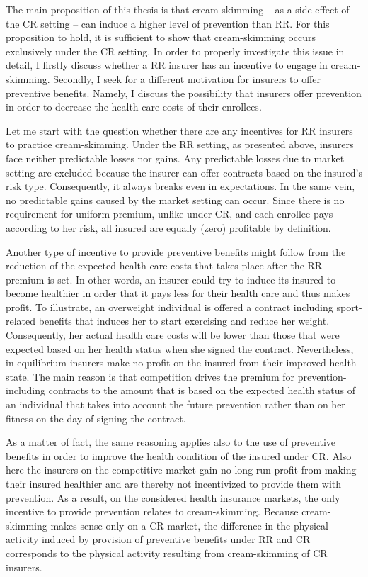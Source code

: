 \documentclass[12pt,english]{article}%
\makeatletter
\renewcommand{\subsection}{\@startsection{subsection}{2}{0mm}{-0.1\baselineskip}{0.5\baselineskip}{\normalfont\bf\flushleft}}
\makeatother
\begin{document}
\subsection{Preventive benefits in the risk-rated contracts}
The main proposition of this thesis is that cream-skimming -- as a side-effect of the CR setting -- can induce a higher level of prevention than RR. For this proposition to hold, it is sufficient to show that cream-skimming occurs exclusively under the CR setting. In order to properly investigate this issue in detail, I firstly discuss whether a RR insurer has an incentive to engage in cream-skimming. Secondly, I seek for a different motivation for insurers to offer preventive benefits. Namely, I discuss the possibility that insurers offer prevention in order to decrease the health-care costs of their enrollees.

Let me start with the question whether there are any incentives for RR insurers to practice cream-skimming. Under the RR setting, as presented above, insurers face neither predictable losses nor gains. Any predictable losses due to market setting are excluded because the insurer can offer contracts based on the insured's risk type. Consequently, it always breaks even in expectations. In the same vein, no predictable gains caused by the market setting can occur. Since there is no requirement for uniform premium, unlike under CR, and each enrollee pays according to her risk, all insured are equally (zero) profitable by definition. 

Another type of incentive to provide preventive benefits might follow from the reduction of the expected health care costs that takes place after the RR premium is set. In other words, an insurer could try to induce its insured to become healthier in order that it pays less for their health care and thus makes profit. To illustrate, an overweight individual is offered a contract including sport-related benefits that induces her to start exercising and reduce her weight. Consequently, her actual health care costs will be lower than those that were expected based on her health status when she signed the contract. Nevertheless, in equilibrium insurers make no profit on the insured from their improved health state. The main reason is that competition drives the premium for prevention-including contracts to the amount that is based on the expected health status of an individual that takes into account the future prevention rather than on her fitness on the day of signing the contract.

As a matter of fact, the same reasoning applies also to the use of preventive benefits in order to improve the health condition of the insured under CR. Also here the insurers on the competitive market gain no long-run profit from making their insured healthier and are thereby not incentivized to provide them with prevention. As a result, on the considered health insurance markets, the only incentive to provide prevention relates to cream-skimming. Because cream-skimming makes sense only on a CR market, the difference in the physical activity induced by provision of preventive benefits under RR and CR corresponds to the physical activity resulting from cream-skimming of CR insurers.
\end{document}
